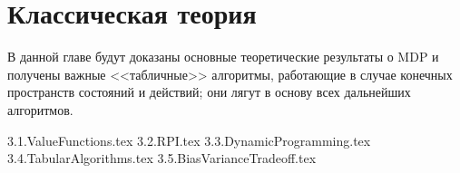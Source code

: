 \documentclass[../main.tex]{subfiles}
\begin{document}
\chapter{Классическая теория}\label{classictheorychapter}

В данной главе будут доказаны основные теоретические результаты о MDP и получены важные <<табличные>> алгоритмы, работающие в случае конечных пространств состояний и действий; они лягут в основу всех дальнейших алгоритмов. 

{3.1.ValueFunctions.tex}
{3.2.RPI.tex}
{3.3.DynamicProgramming.tex}
{3.4.TabularAlgorithms.tex}
{3.5.BiasVarianceTradeoff.tex}
\end{document}
